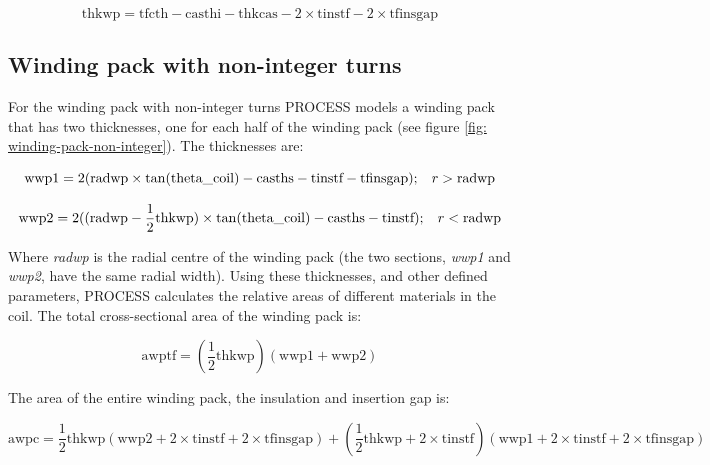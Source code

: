 \documentclass[hidelinks]{article}
\numberwithin{equation}{section}
\begin{document}
    \begin{equation}\label{eq: thkwp}
    \text{thkwp} = \text{tfcth} - \text{casthi} - \text{thkcas} - 2\times \text{tinstf} 
    - 2\times \text{tfinsgap}
    \end{equation}

    \subsection{Winding pack with non-integer turns}

    \noi For the winding pack with non-integer turns PROCESS models a winding pack 
    that has two thicknesses, one for each half of the winding pack (see figure 
    \ref{fig: winding-pack-non-integer}). The thicknesses are:

    \begin{equation}\label{eq: wwp1}
    \text{wwp1} = 2(\text{radwp}\times \tan(\text{theta\_coil}) - \text{casths} - \text{tinstf} 
    - \text{tfinsgap}); \hspace{0.3cm} r > \text{radwp}
    \end{equation}

    \begin{equation}\label{eq: wwp2}
    \text{wwp2} = 2((\text{radwp}-\frac{1}{2}\text{thkwp})\times \tan(\text{theta\_coil}) - 
    \text{casths} - \text{tinstf}); \hspace{0.3cm} r < \text{radwp} 
    \end{equation}

    \noi Where \emph{radwp} is the radial centre of the winding pack (the two sections, 
    \emph{wwp1} and \emph{wwp2}, have the same radial width). Using these thicknesses, and 
    other defined parameters, PROCESS calculates the relative areas of different materials in 
    the coil. The total cross-sectional area of the winding pack is:

    \begin{equation}\label{eq: awptf}
    \text{awptf} = (\frac{1}{2}\text{thkwp})(\text{wwp1}+\text{wwp2}) 
    \end{equation}

    \noi The area of the entire winding pack, the insulation and insertion gap is:

    \begin{equation}\label{eq: awpc}
    \text{awpc} = \frac{1}{2}\text{thkwp}(\text{wwp2} + 2\times \text{tinstf} 
    + 2\times \text{tfinsgap}) + (\frac{1}{2}\text{thkwp} + 2\times \text{tinstf})(\text{wwp1} 
    + 2 \times \text{tinstf} + 2\times \text{tfinsgap})
    \end{equation}
\end{document}

